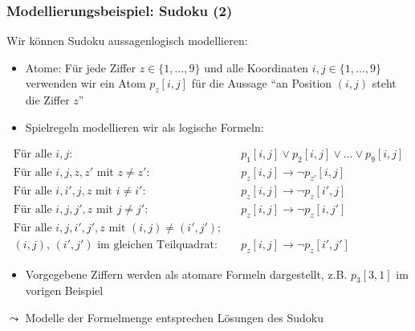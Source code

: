 \documentclass[aspectratio=1610,onlymath]{beamer}
\begin{document}
\begin{frame}\frametitle{Modellierungsbeispiel: Sudoku (2)}

Wir können Sudoku aussagenlogisch modellieren:\pause

\begin{itemize}
\item \alert{Atome:} Für jede Ziffer $z\in\{1,\ldots,9\}$ und alle Koordinaten $i,j\in\{1,\ldots,9\}$ verwenden wir ein Atom $p_z[i,j]$ für die Aussage "`an Position $(i,j)$ steht die Ziffer $z$"'
\pause
\item \alert{Spielregeln} modellieren wir als logische Formeln:
\end{itemize}\vspace{-2.5ex}
\begin{align*}
\text{Für alle $i,j$:} & \quad p_1[i,j]\vee p_2[i,j]\vee\ldots\vee p_9[i,j] %
\\
\text{Für alle $i,j,z,z'$ mit $z\neq z'$:} & \quad p_z[i,j] \to \neg p_{z'}[i,j] %
\\
\text{Für alle $i,i',j,z$ mit $i\neq i'$:} & \quad p_z[i,j] \to \neg p_z[i',j] %
\\
\text{Für alle $i,j,j',z$ mit $j\neq j'$:} & \quad p_z[i,j] \to \neg p_z[i,j'] %
\\
\text{Für alle $i,j,i',j',z$ mit $(i,j)\neq (i',j')$;}\\
\text{$(i,j)$, $(i',j')$  im gleichen Teilquadrat:} & \quad p_z[i,j] \to \neg p_z[i',j'] %
\end{align*}\vspace{-4ex}\pause
\begin{itemize}
\item \alert{Vorgegebene Ziffern} werden als atomare Formeln dargestellt, z.B. $p_3[3,1]$ im vorigen Beispiel
\end{itemize}\pause
$\leadsto$ Modelle der Formelmenge entsprechen Lösungen des Sudoku

\end{frame}



\newcommand{\emphcell}[1]{\only<#1>{\cellcolor{strongyellow}}}
\end{document}
